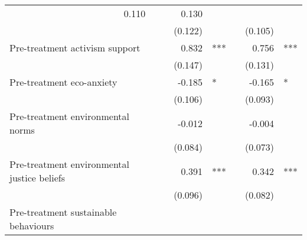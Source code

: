 \documentclass{article}
\begin{document}
\begin{table}[!h]
\begin{tabular}{llllllll}
  \multicolumn{1}{r}{0.110} &
  \multicolumn{1}{l}{} &
  \multicolumn{1}{r}{} &
  \multicolumn{1}{r}{0.130} &
  \multicolumn{1}{l}{} \\
\multicolumn{1}{l}{} &
  \multicolumn{1}{r}{} &
  \multicolumn{1}{l}{} &
  \multicolumn{1}{r}{(0.122)} &
  \multicolumn{1}{l}{} &
  \multicolumn{1}{r}{} &
  \multicolumn{1}{r}{(0.105)} &
  \multicolumn{1}{l}{} \\
\multicolumn{1}{l}{Pre-treatment activism support} &
  \multicolumn{1}{r}{} &
  \multicolumn{1}{l}{} &
  \multicolumn{1}{r}{0.832} &
  \multicolumn{1}{l}{***} &
  \multicolumn{1}{r}{} &
  \multicolumn{1}{r}{0.756} &
  \multicolumn{1}{l}{***} \\
\multicolumn{1}{l}{} &
  \multicolumn{1}{r}{} &
  \multicolumn{1}{l}{} &
  \multicolumn{1}{r}{(0.147)} &
  \multicolumn{1}{l}{} &
  \multicolumn{1}{r}{} &
  \multicolumn{1}{r}{(0.131)} &
  \multicolumn{1}{l}{} \\
\multicolumn{1}{l}{Pre-treatment eco-anxiety} &
  \multicolumn{1}{r}{} &
  \multicolumn{1}{l}{} &
  \multicolumn{1}{r}{-0.185} &
  \multicolumn{1}{l}{*} &
  \multicolumn{1}{r}{} &
  \multicolumn{1}{r}{-0.165} &
  \multicolumn{1}{l}{*} \\
\multicolumn{1}{l}{} &
  \multicolumn{1}{r}{} &
  \multicolumn{1}{l}{} &
  \multicolumn{1}{r}{(0.106)} &
  \multicolumn{1}{l}{} &
  \multicolumn{1}{r}{} &
  \multicolumn{1}{r}{(0.093)} &
  \multicolumn{1}{l}{} \\
\multicolumn{1}{l}{Pre-treatment environmental norms} &
  \multicolumn{1}{r}{} &
  \multicolumn{1}{l}{} &
  \multicolumn{1}{r}{-0.012} &
  \multicolumn{1}{l}{} &
  \multicolumn{1}{r}{} &
  \multicolumn{1}{r}{-0.004} &
  \multicolumn{1}{l}{} \\
\multicolumn{1}{l}{} &
  \multicolumn{1}{r}{} &
  \multicolumn{1}{l}{} &
  \multicolumn{1}{r}{(0.084)} &
  \multicolumn{1}{l}{} &
  \multicolumn{1}{r}{} &
  \multicolumn{1}{r}{(0.073)} &
  \multicolumn{1}{l}{} \\
\multicolumn{1}{l}{Pre-treatment environmental justice beliefs} &
  \multicolumn{1}{r}{} &
  \multicolumn{1}{l}{} &
  \multicolumn{1}{r}{0.391} &
  \multicolumn{1}{l}{***} &
  \multicolumn{1}{r}{} &
  \multicolumn{1}{r}{0.342} &
  \multicolumn{1}{l}{***} \\
\multicolumn{1}{l}{} &
  \multicolumn{1}{r}{} &
  \multicolumn{1}{l}{} &
  \multicolumn{1}{r}{(0.096)} &
  \multicolumn{1}{l}{} &
  \multicolumn{1}{r}{} &
  \multicolumn{1}{r}{(0.082)} &
  \multicolumn{1}{l}{} \\
\multicolumn{1}{l}{Pre-treatment sustainable behaviours} &

\end{tabular}
\end{table}
\end{document}
